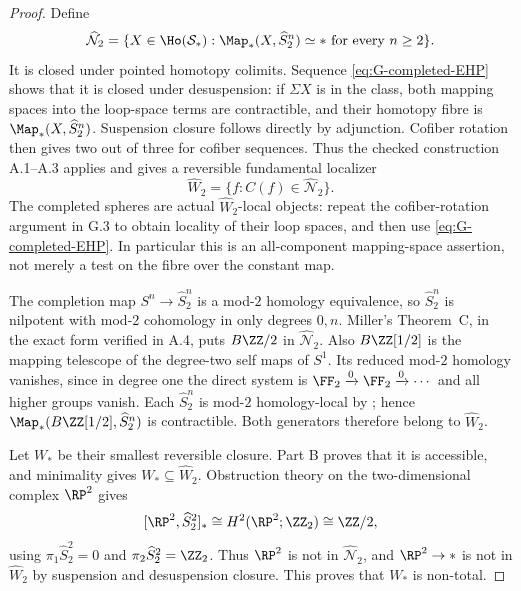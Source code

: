 \begin{proof}
Define
\[
 \widehat{\mathcal N}_2
 =\{X\in\Ho(\mathcal S_*):\Map_*(X,\widehat S^n_2)\simeq *
                       \text{ for every }n\geq2\}.
\]
It is closed under pointed homotopy colimits. Sequence \eqref{eq:G-completed-EHP} shows that it is closed under desuspension: if $\Sigma X$ is in the class, both mapping spaces into the loop-space terms are contractible, and their homotopy fibre is $\Map_*(X,\widehat S^n_2)$. Suspension closure follows directly by adjunction. Cofiber rotation then gives two out of three for cofiber sequences. Thus the checked construction A.1--A.3 applies and gives a reversible fundamental localizer
\[
 \widehat W_2=\{f:C(f)\in\widehat{\mathcal N}_2\}.
\]
The completed spheres are actual $\widehat W_2$-local objects: repeat the cofiber-rotation argument in G.3 to obtain locality of their loop spaces, and then use \eqref{eq:G-completed-EHP}. In particular this is an all-component mapping-space assertion, not merely a test on the fibre over the constant map.

The completion map $S^n\to\widehat S^n_2$ is a mod-$2$ homology equivalence, so $\widehat S^n_2$ is nilpotent with mod-$2$ cohomology in only degrees $0,n$. Miller's Theorem~C, in the exact form verified in A.4, puts $B\ZZ/2$ in $\widehat{\mathcal N}_2$. Also $B\ZZ[1/2]$ is the mapping telescope of the degree-two self maps of $S^1$. Its reduced mod-$2$ homology vanishes, since in degree one the direct system is $\FF_2\xrightarrow{0}\FF_2\xrightarrow{0}\cdots$ and all higher groups vanish. Each $\widehat S^n_2$ is mod-$2$ homology-local by \cite[Theorems 11.1.1--11.1.2]{FGHMayPonto2012}; hence $\Map_*(B\ZZ[1/2],\widehat S^n_2)$ is contractible. Both generators therefore belong to $\widehat W_2$.

Let $W_*$ be their smallest reversible closure. Part B proves that it is accessible, and minimality gives $W_*\subseteq\widehat W_2$. Obstruction theory on the two-dimensional complex $\RP^2$ gives
\[
 [\RP^2,\widehat S^2_2]_*\cong
 H^2(\RP^2;\ZZ_2)\cong\ZZ/2,
\]
using $\pi_1\widehat S^2_2=0$ and $\pi_2\widehat S^2_2=\ZZ_2$. Thus $\RP^2$ is not in $\widehat{\mathcal N}_2$, and $\RP^2\to *$ is not in $\widehat W_2$ by suspension and desuspension closure. This proves that $W_*$ is non-total.


\end{proof}
